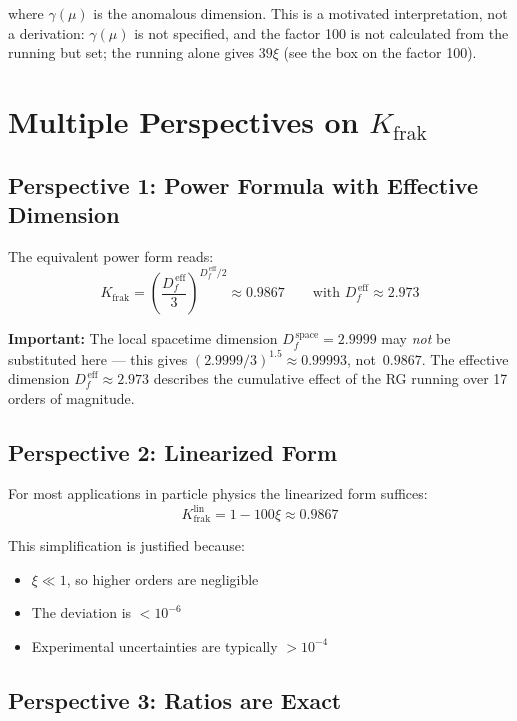 	where $\gamma(\mu)$ is the anomalous dimension. This is a motivated interpretation, not a derivation: $\gamma(\mu)$ is not specified, and the factor 100 is not calculated from the running but set; the running alone gives $39\xi$ (see the box on the factor 100).
	
		\section{Multiple Perspectives on $K_{\text{frak}}$}
	
	\subsection{Perspective 1: Power Formula with Effective Dimension}
	
	The equivalent power form reads:
	\begin{equation}
		K_{\text{frak}} = \left(\frac{D_f^{\,\text{eff}}}{3}\right)^{D_f^{\,\text{eff}}/2} \approx 0.9867 \qquad \text{with } D_f^{\,\text{eff}} \approx 2.973
		\label{eq:exact_kfrak_en}
	\end{equation}
	
	\textbf{Important:} The local spacetime dimension $D_f^{\,\text{space}} = 2.9999$ may \emph{not} be substituted here --- this gives $(2.9999/3)^{1.5} \approx 0.99993$, not~$0.9867$. The effective dimension $D_f^{\,\text{eff}} \approx 2.973$ describes the cumulative effect of the RG running over 17 orders of magnitude.
	
	\subsection{Perspective 2: Linearized Form}
	
	For most applications in particle physics the linearized form suffices:
	\begin{equation}
		K_{\text{frak}}^{\text{lin}} = 1 - 100\xi \approx 0.9867
		\label{eq:linear_kfrak_en}
	\end{equation}
	
	This simplification is justified because:
	\begin{itemize}
		\item $\xi \ll 1$, so higher orders are negligible
		\item The deviation is $< 10^{-6}$
		\item Experimental uncertainties are typically $> 10^{-4}$
	\end{itemize}
	
	\subsection{Perspective 3: Ratios are Exact}
	
